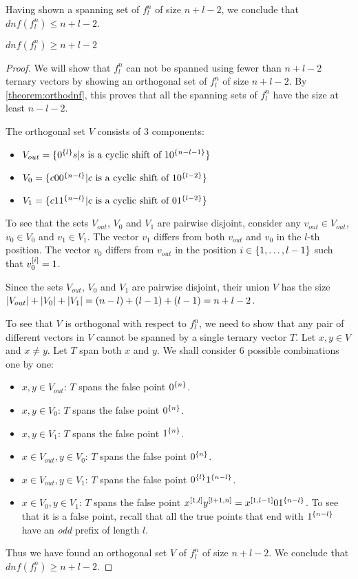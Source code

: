 Having shown a spanning set of $f_l^n$ of size $n+l-2$,
we conclude that $dnf(f_l^n) \leq n+l-2$.

\begin{lemma}
$dnf(f_l^n) \geq n+l-2$
\end{lemma}

\begin{proof}
We will show that $f_l^n$ can not be spanned
using fewer than $n+l-2$ ternary vectors
by showing an orthogonal set of $f_l^n$ of size $n+l-2$.
By \autoref{theorem:orthodnf},
this proves that all the spanning sets of $f_l^n$
have the size at least $n-l-2$.

The orthogonal set $V$ consists of 3 components:
\begin{itemize}
\item
$V_{out} = \{0^{\{l\}} s
| s \text{ is a cyclic shift of } 1 0^{\{n-l-1\}}\}$
\item
$V_0 = \{c 0 0^{\{n-l\}}
| c \text{ is a cyclic shift of } 1 0^{\{l-2\}}\}$
\item
$V_1 = \{c 1 1^{\{n-l\}}
| c \text{ is a cyclic shift of } 0 1^{\{l-2\}}\}$
\end{itemize}

To see that the sets $V_{out}$, $V_0$ and $V_1$
are pairwise disjoint,
consider any $v_{out} \in V_{out}$,
$v_0 \in V_0$ and $v_1 \in V_1$.
The vector $v_1$ differs from both $v_{out}$ and $v_0$
in the $l$-th position.
The vector $v_0$ differs from $v_{out}$
in the position $i \in \{1, \ldots, l-1\}$
such that $v_0^{[i]} = 1$.

Since the sets $V_{out}$, $V_0$ and $V_1$
are pairwise disjoint,
their union $V$
has the size
$\lvert V_{out}\rvert + \lvert V_0\rvert + \lvert V_1\rvert
= (n-l) + (l-1) + (l-1) = n+l-2$.

To see that $V$ is orthogonal with respect to $f^n_l$,
we need to show that any pair of different vectors in $V$
cannot be spanned by a single ternary vector $T$.
Let $x,y \in V$ and $x \neq y$.
Let $T$ span both $x$ and $y$.
We shall consider 6 possible combinations one by one:
\begin{itemize}
\item $x,y \in V_{out}$:
$T$ spans the false point $0^{\{n\}}$.
\item $x,y \in V_0$:
$T$ spans the false point $0^{\{n\}}$.
\item $x,y \in V_1$:
$T$ spans the false point $1^{\{n\}}$.
\item $x \in V_{out}, y \in V_0$:
$T$ spans the false point $0^{\{n\}}$.
\item $x \in V_{out}, y \in V_1$:
$T$ spans the false point $0^{\{l\}} 1^{\{n-l\}}$.
\item $x \in V_0, y \in V_1$:
$T$ spans the false point
$x^{[1, l]} y^{[l+1, n]}
= x^{[1, l-1]} 0 1^{\{n-l\}}$.
To see that it is a false point,
recall that
all the true points that end with $1^{\{n-l\}}$
have an \emph{odd} prefix of length $l$.
\end{itemize}

Thus we have found an orthogonal set $V$ of $f_l^n$
of size $n+l-2$.
We conclude that $dnf(f_l^n) \geq n+l-2$.
\end{proof}

